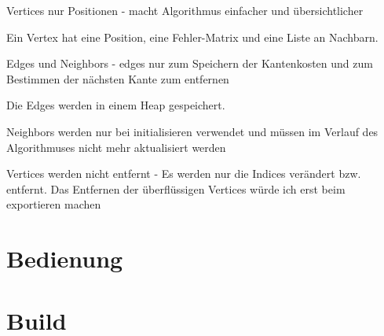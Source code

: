 \documentclass[a4paper,12pt]{book}
\begin{document}
Vertices nur Positionen - macht Algorithmus einfacher und übersichtlicher

Ein Vertex hat eine Position, eine Fehler-Matrix und eine Liste an Nachbarn.

Edges und Neighbors - edges nur zum Speichern der Kantenkosten und zum Bestimmen der nächsten Kante zum entfernen

Die Edges werden in einem Heap gespeichert. 

Neighbors werden nur bei initialisieren verwendet und müssen im Verlauf des Algorithmuses nicht mehr aktualisiert werden

Vertices werden nicht entfernt - Es werden nur die Indices verändert bzw. entfernt. Das Entfernen der überflüssigen Vertices würde ich erst beim exportieren machen

\section*{Bedienung}

\section*{Build}
\end{document}
